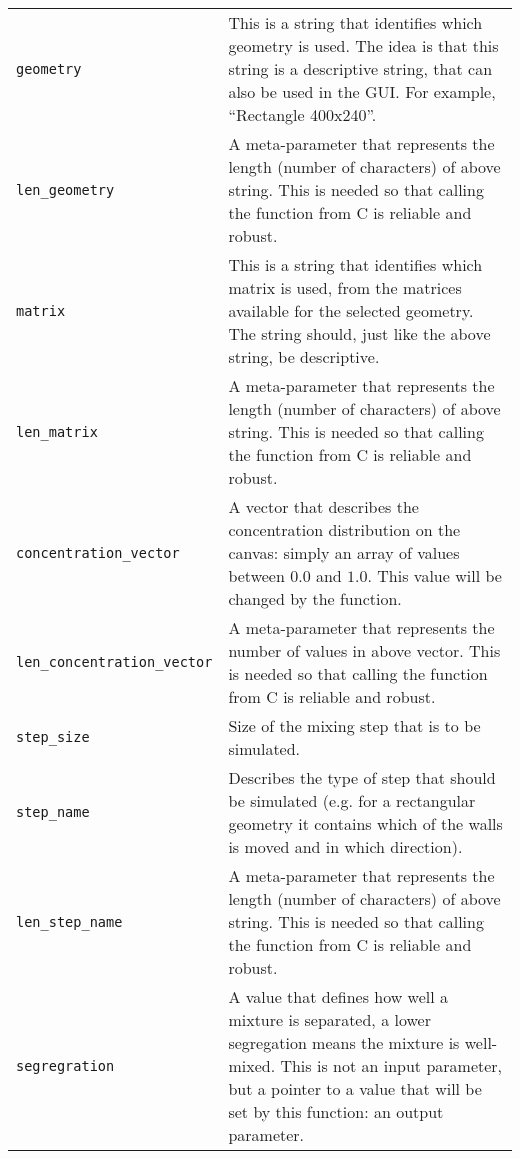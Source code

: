 \begin{longtable}{@{}lX@{}}
	\toprule
	\endfirsthead
	\midrule
	\endhead
	
	\texttt{geometry} & This is a string that identifies which geometry is used. The idea is that this string is a descriptive string, that can also be used in the GUI. For example, ``Rectangle 400x240''. \\
	\texttt{len\_geometry} & A meta-parameter that represents the length (number of characters) of above string. This is needed so that calling the function from C is reliable and robust. \\
	\midrule
	
	\texttt{matrix} & This is a string that identifies which matrix is used, from the matrices available for the selected geometry. The string should, just like the above string, be descriptive. \\
	\texttt{len\_matrix} & A meta-parameter that represents the length (number of characters) of above string. This is needed so that calling the function from C is reliable and robust. \\
	\midrule
	
	\texttt{concentration\_vector} & A vector that describes the concentration distribution on the canvas: simply an array of values between $0.0$ and $1.0$. This value will be changed by the function. \\
	\texttt{len\_concentration\_vector} & A meta-parameter that represents the number of values in above vector. This is needed so that calling the function from C is reliable and robust. \\
	\midrule
	
	\texttt{step\_size} & Size of the mixing step that is to be simulated. \\
	\midrule
	
	\texttt{step\_name} & Describes the type of step that should be simulated (e.g. for a rectangular geometry it contains which of the walls is moved and in which direction). \\
	\texttt{len\_step\_name} & A meta-parameter that represents the length (number of characters) of above string. This is needed so that calling the function from C is reliable and robust. \\
	\midrule
	
	\texttt{segregration} & A value that defines how well a mixture is separated, a lower segregation means the mixture is well-mixed. This is not an input parameter, but a pointer to a value that will be set by this function: an output parameter. \\
	\bottomrule
\end{longtable}